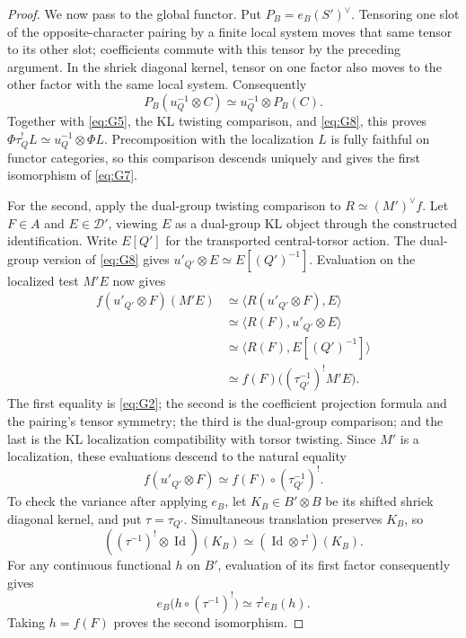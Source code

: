 \begin{proof}
We now pass to the global functor.  Put \(P_B=e_B(S')^\vee\).
Tensoring one slot of the opposite-character pairing by a finite
local system moves that same tensor to its other slot; coefficients
commute with this tensor by the preceding argument.  In the shriek
diagonal kernel, tensor on one factor also moves to the other factor
with the same local system.  Consequently
\[
 P_B(u_Q^{-1}\otimes C)\simeq u_Q^{-1}\otimes P_B(C).
\]
Together with \eqref{eq:G5}, the KL twisting comparison, and
\eqref{eq:G8}, this proves
\(\Phi\tau_Q^!L\simeq u_Q^{-1}\otimes\Phi L\).
Precomposition with the localization \(L\) is fully faithful on
functor categories, so this comparison descends uniquely and gives
the first isomorphism of \eqref{eq:G7}.

For the second, apply the dual-group twisting comparison to
\(R\simeq(M')^\vee f\).  Let \(F\in A\) and \(E\in\mathcal D'\),
viewing \(E\) as a dual-group KL object through the constructed
identification.  Write \(E[Q']\) for the transported central-torsor
action.  The dual-group version of \eqref{eq:G8} gives
\(u'_{Q'}\otimes E\simeq E[(Q')^{-1}]\).  Evaluation on the
localized test \(M'E\) now gives
\[
 \begin{aligned}
 f(u'_{Q'}\otimes F)(M'E)
 &\simeq\bigl\langle R(u'_{Q'}\otimes F),E\bigr\rangle\\
 &\simeq\bigl\langle R(F),u'_{Q'}\otimes E\bigr\rangle\\
 &\simeq\bigl\langle R(F),E[(Q')^{-1}]\bigr\rangle\\
 &\simeq f(F)\bigl((\tau_{Q'}^{-1})^!M'E\bigr).
 \end{aligned}
\]
The first equality is \eqref{eq:G2}; the second is the coefficient
projection formula and the pairing's tensor symmetry; the third is
the dual-group comparison; and the last is the KL localization
compatibility with torsor twisting.  Since \(M'\) is a localization,
these evaluations descend to the natural equality
\[
 f(u'_{Q'}\otimes F)
 \simeq f(F)\circ(\tau_{Q'}^{-1})^!.
\]
To check the variance after applying \(e_B\), let
\(K_B\in B'\otimes B\) be its shifted shriek diagonal kernel,
and put \(\tau=\tau_{Q'}\).  Simultaneous translation preserves
\(K_B\), so
\[
 ((\tau^{-1})^!\otimes\operatorname{Id})(K_B)
   \simeq(\operatorname{Id}\otimes\tau^!)(K_B).
\]
For any continuous functional \(h\) on \(B'\), evaluation of
its first factor consequently gives
\[
 e_B\bigl(h\circ(\tau^{-1})^!\bigr)
   \simeq\tau^!e_B(h).
\]
Taking \(h=f(F)\) proves the second isomorphism.


\end{proof}
